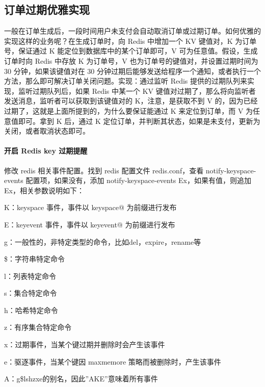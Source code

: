 \documentclass[../../../interview-questions.tex]{subfiles}
\begin{document}
\subsection{订单过期优雅实现}

一般在订单生成后，一段时间用户未支付会自动取消订单或过期订单。如何优雅的实现这样的业务呢？在生成订单时，向 Redis 中增加一个 KV 键值对，K 为订单号，保证通过 K 能定位到数据库中的某个订单即可，V 可为任意值。假设，生成订单时向 Redis 中存放 K 为订单号，V 也为订单号的键值对，并设置过期时间为 30 分钟，如果该键值对在 30 分钟过期后能够发送给程序一个通知，或者执行一个方法，那么即可解决订单关闭问题。实现：通过监听 Redis 提供的过期队列来实现，监听过期队列后，如果 Redis 中某一个 KV 键值对过期了，那么将向监听者发送消息，监听者可以获取到该键值对的 K，注意，是获取不到 V 的，因为已经过期了，这就是上面所提到的，为什么要保证能通过 K 来定位到订单，而 V 为任意值即可。拿到 K 后，通过 K 定位订单，并判断其状态，如果是未支付，更新为关闭，或者取消状态即可。

\paragraph{开启 Redis key 过期提醒}


修改 redis 相关事件配置。找到 redis 配置文件 redis.conf，查看 notify-keyspace-events 配置项，如果没有，添加 notify-keyspace-events Ex，如果有值，则追加 Ex，相关参数说明如下：

K：keyspace 事件，事件以 keyspace@ 为前缀进行发布

E：keyevent 事件，事件以 keyevent@ 为前缀进行发布

g：一般性的，非特定类型的命令，比如del，expire，rename等

\$：字符串特定命令

l：列表特定命令

s：集合特定命令

h：哈希特定命令

z：有序集合特定命令

x：过期事件，当某个键过期并删除时会产生该事件

e：驱逐事件，当某个键因 maxmemore 策略而被删除时，产生该事件

A：g\$lshzxe的别名，因此”AKE”意味着所有事件
\end{document}
